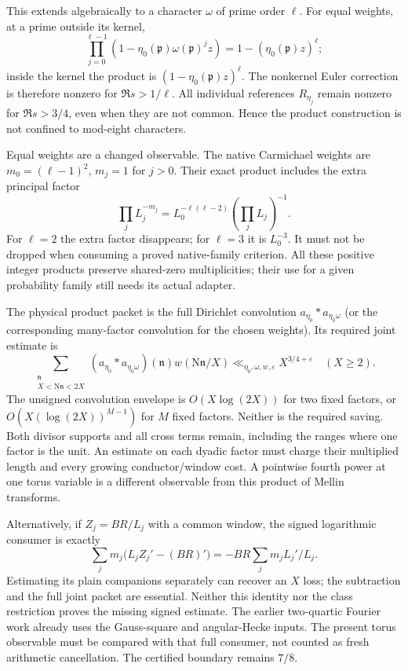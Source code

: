 \documentclass[11pt]{article}
\newcommand{\N}{\mathrm N}
\newcommand{\eps}{\varepsilon}
\begin{document}
This extends algebraically to a character $\omega$ of prime order
$\ell$. For equal weights, at a prime outside its kernel,
\[
 \prod_{j=0}^{\ell-1}(1-\eta_0(\mathfrak p)
                 \omega(\mathfrak p)^j z)=1-(\eta_0(\mathfrak p)z)^\ell;
\]
inside the kernel the product is $(1-\eta_0(\mathfrak p)z)^\ell$.
The nonkernel Euler correction is therefore nonzero for
$\Re s>1/\ell$. All individual references $R_{\eta_j}$ remain
nonzero for $\Re s>3/4$, even when they are not common.
Hence the product construction is not confined to mod-eight characters.

Equal weights are a changed observable. The native Carmichael weights
are $m_0=(\ell-1)^2$, $m_j=1$ for $j>0$. Their exact product includes
the extra principal factor
\[
 \prod_j L_j^{-m_j}
   =L_0^{-\ell(\ell-2)}\left(\prod_jL_j\right)^{-1}.
\]
For $\ell=2$ the extra factor disappears; for $\ell=3$ it is $L_0^{-3}$.
It must not be dropped when consuming a proved native-family criterion.
All these positive integer products preserve shared-zero multiplicities;
their use for a given probability family still needs its actual adapter.

The physical product packet is the full Dirichlet convolution
$a_{\eta_0}*a_{\eta_0\omega}$ (or the corresponding many-factor
convolution for the chosen weights). Its required joint estimate is
\[
 \sum_{\substack{\mathfrak n\\X<\N\mathfrak n<2X}}
 (a_{\eta_0}*a_{\eta_0\omega})(\mathfrak n)
 w(\N\mathfrak n/X)
 \ll_{\eta_0,\omega,w,\eps}X^{3/4+\eps}\quad(X\ge2).
\]
The unsigned convolution envelope is $O(X\log(2X))$ for two fixed
factors, or $O(X(\log(2X))^{M-1})$ for $M$ fixed factors.
Neither is the required saving. Both divisor supports and all
cross terms remain, including the ranges where one factor is the unit.
An estimate on each dyadic factor must charge their multiplied length
and every growing conductor/window cost.
A pointwise fourth power at one torus variable is a different
observable from this product of Mellin transforms.

Alternatively, if $Z_j=BR/L_j$ with a common window, the signed
logarithmic consumer is exactly
\[
 \sum_jm_j\bigl(L_jZ_j'-(BR)'\bigr)
    =-BR\sum_jm_jL_j'/L_j .
\]
Estimating its plain companions separately can recover an $X$ loss;
the subtraction and the full joint packet are essential.
Neither this identity nor the class restriction proves the missing
signed estimate. The earlier two-quartic Fourier work already uses
the Gauss-square and angular-Hecke inputs. The present torus observable
must be compared with that full consumer, not counted as fresh
arithmetic cancellation. The certified boundary remains $7/8$.
\end{document}

